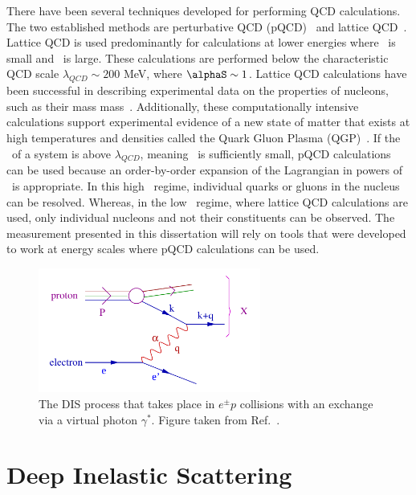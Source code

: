 There have been several techniques developed for performing QCD calculations. The two established methods are perturbative QCD (pQCD)~\cite{Brock:1993sz} and lattice QCD~\cite{creutz1985quarks}. Lattice QCD is used predominantly for calculations at lower energies where \qsquare\ is small and \alphaS\ is large. These calculations are performed below the characteristic QCD scale $\lambda_{QCD}\sim200$ MeV, where $\alphaS\sim 1$. Lattice QCD calculations have been successful in describing experimental data on the properties of nucleons, such as their mass mass~\cite{Borsanyi:2014jba}. Additionally, these computationally intensive calculations support experimental evidence of a new state of matter that exists at high temperatures and densities called the Quark Gluon Plasma (QGP)~\cite{Harris:1996zx,Adcox:2004mh,Adams:2005dq,Arsene:2004fa,Back:2004je}. If the \qsquare\ of a system is above $\lambda_{QCD}$, meaning \alphaS\ is sufficiently small, pQCD calculations can be used because an order-by-order expansion of the Lagrangian in powers of \alphaS\ is appropriate. In this high \qsquare\ regime, individual quarks or gluons in the nucleus can be resolved. Whereas, in the low \qsquare\ regime, where lattice QCD calculations are used, only individual nucleons and not their constituents can be observed. The measurement presented in this dissertation will rely on tools that were developed to work at energy scales where pQCD calculations can be used.

\begin{figure}[hb]
	\centerline{
		\includegraphics[width=0.65\textwidth]{figures/dis_2.pdf} 
	}
	\caption{ The DIS process that takes place in $e^{\pm}p$ collisions with an exchange via a virtual photon $\gamma^{*}$. Figure taken from Ref.~\cite{Iancu:2012xa}. }
	\label{fig:dis}
\end{figure}


\section{Deep Inelastic Scattering}

